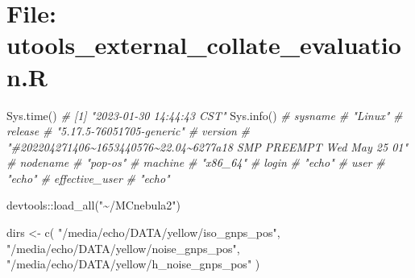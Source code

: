 \documentclass[
]{article}
\newenvironment{Shaded}{\begin{snugshade}}{\end{snugshade}}
\newcommand{\CommentTok}[1]{\textcolor[rgb]{0.56,0.35,0.01}{\textit{#1}}}
\newcommand{\FunctionTok}[1]{\textcolor[rgb]{0.00,0.00,0.00}{#1}}
\newcommand{\NormalTok}[1]{#1}
\newcommand{\OtherTok}[1]{\textcolor[rgb]{0.56,0.35,0.01}{#1}}
\newcommand{\SpecialCharTok}[1]{\textcolor[rgb]{0.00,0.00,0.00}{#1}}
\newcommand{\StringTok}[1]{\textcolor[rgb]{0.31,0.60,0.02}{#1}}
\begin{document}
\hypertarget{file-utools_external_collate_evaluation.r}{%
\section{File: utools\_external\_collate\_evaluation.R}\label{file-utools_external_collate_evaluation.r}}

\begin{Shaded}
\begin{Highlighting}[]
\FunctionTok{Sys.time}\NormalTok{()}
\CommentTok{\# [1] "2023{-}01{-}30 14:44:43 CST"}
\FunctionTok{Sys.info}\NormalTok{()}
\CommentTok{\#                                                            sysname }
\CommentTok{\#                                                            "Linux" }
\CommentTok{\#                                                            release }
\CommentTok{\#                                          "5.17.5{-}76051705{-}generic" }
\CommentTok{\#                                                            version }
\CommentTok{\# "\#202204271406\textasciitilde{}1653440576\textasciitilde{}22.04\textasciitilde{}6277a18 SMP PREEMPT Wed May 25 01" }
\CommentTok{\#                                                           nodename }
\CommentTok{\#                                                           "pop{-}os" }
\CommentTok{\#                                                            machine }
\CommentTok{\#                                                           "x86\_64" }
\CommentTok{\#                                                              login }
\CommentTok{\#                                                             "echo" }
\CommentTok{\#                                                               user }
\CommentTok{\#                                                             "echo" }
\CommentTok{\#                                                     effective\_user }
\CommentTok{\#                                                             "echo" }

\NormalTok{devtools}\SpecialCharTok{::}\FunctionTok{load\_all}\NormalTok{(}\StringTok{"\textasciitilde{}/MCnebula2"}\NormalTok{)}

\NormalTok{dirs }\OtherTok{\textless{}{-}} \FunctionTok{c}\NormalTok{(}
  \StringTok{"/media/echo/DATA/yellow/iso\_gnps\_pos"}\NormalTok{,}
  \StringTok{"/media/echo/DATA/yellow/noise\_gnps\_pos"}\NormalTok{,}
  \StringTok{"/media/echo/DATA/yellow/h\_noise\_gnps\_pos"}
\NormalTok{)}


\end{Highlighting}
\end{Shaded}
\end{document}
